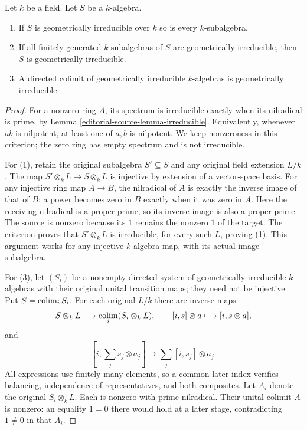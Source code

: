 \begin{lemma}
\label{editorial-source-lemma-subalgebra-geometrically-irreducible}
Let $k$ be a field. Let $S$ be a $k$-algebra.
\begin{enumerate}
\item If $S$ is geometrically irreducible over $k$ so is every
$k$-subalgebra.
\item If all finitely generated $k$-subalgebras of $S$ are
geometrically irreducible, then $S$ is geometrically irreducible.
\item A directed colimit of geometrically irreducible $k$-algebras
is geometrically irreducible.
\end{enumerate}
\end{lemma}

\begin{proof}
For a nonzero ring $A$, its spectrum
is irreducible exactly when its
nilradical is prime, by Lemma
\ref{editorial-source-lemma-irreducible}. Equivalently,
whenever $ab$ is nilpotent, at
least one of $a,b$ is nilpotent.
We keep nonzeroness in this
criterion; the zero ring has
empty spectrum and is not
irreducible.

For (1), retain the original
subalgebra $S'\subseteq S$ and
any original field extension
$L/k$. The map
$S'\otimes_k L\to S\otimes_k L$
is injective by extension of
a vector-space basis. For any
injective ring map $A\to B$,
the nilradical of $A$ is exactly
the inverse image of that of
$B$: a power becomes zero in
$B$ exactly when it was zero
in $A$. Here the receiving
nilradical is a proper prime,
so its inverse image is also
a proper prime. The source is
nonzero because its $1$ remains
the nonzero $1$ of the target.
The criterion proves that
$S'\otimes_k L$ is irreducible,
for every such $L$, proving (1).
This argument works for any
injective $k$-algebra map, with
its actual image subalgebra.

For (3), let $(S_i)$ be a
nonempty directed system of
geometrically irreducible
$k$-algebras with their original
unital transition maps; they
need not be injective. Put
$S=\mathop{\rm colim}_i S_i$.
For each original $L/k$ there
are inverse maps
$$
S\otimes_k L\longrightarrow
\mathop{\rm colim}_i(S_i\otimes_k L),
\qquad [i,s]\otimes a\longmapsto[i,s\otimes a],
$$
and
$$
[i,\sum_j s_j\otimes a_j]
\longmapsto\sum_j[i,s_j]\otimes a_j.
$$
All expressions use finitely
many elements, so a common
later index verifies balancing,
independence of representatives,
and both composites. Let $A_i$
denote the original $S_i\otimes_k L$.
Each is nonzero with prime
nilradical. Their unital colimit
$A$ is nonzero: an equality
$1=0$ there would hold at a
later stage, contradicting
$1\neq0$ in that $A_i$.


\end{proof}
